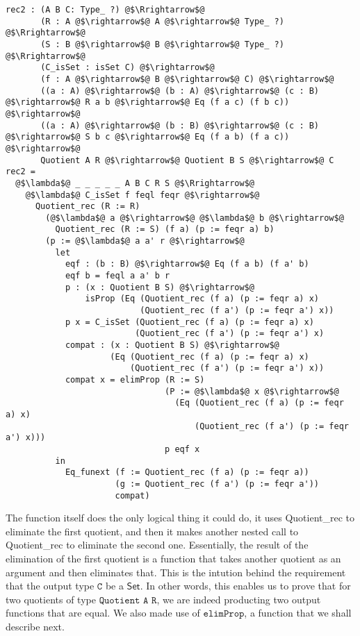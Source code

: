 \documentclass[12pt,twoside,maitrise]{dms}
\theoremstyle{definition}
\numberwithin{equation}{section}
\numberwithin{table}{chapter}
\numberwithin{figure}{chapter}
\newcommand\kw[1] {\textsf{#1}}
\newcommand\id[1] {\texttt{#1}}
\begin{document}
\begin{verbatim}
rec2 : (A B C: Type_ ?) @$\Rrightarrow$@
       (R : A @$\rightarrow$@ A @$\rightarrow$@ Type_ ?) @$\Rrightarrow$@
       (S : B @$\rightarrow$@ B @$\rightarrow$@ Type_ ?) @$\Rrightarrow$@
       (C_isSet : isSet C) @$\rightarrow$@
       (f : A @$\rightarrow$@ B @$\rightarrow$@ C) @$\rightarrow$@
       ((a : A) @$\rightarrow$@ (b : A) @$\rightarrow$@ (c : B) @$\rightarrow$@ R a b @$\rightarrow$@ Eq (f a c) (f b c)) @$\rightarrow$@
       ((a : A) @$\rightarrow$@ (b : B) @$\rightarrow$@ (c : B) @$\rightarrow$@ S b c @$\rightarrow$@ Eq (f a b) (f a c)) @$\rightarrow$@
       Quotient A R @$\rightarrow$@ Quotient B S @$\rightarrow$@ C
rec2 =
  @$\lambda$@ _ _ _ _ _ A B C R S @$\Rrightarrow$@
    @$\lambda$@ C_isSet f feql feqr @$\rightarrow$@
      Quotient_rec (R := R)
        (@$\lambda$@ a @$\rightarrow$@ @$\lambda$@ b @$\rightarrow$@
          Quotient_rec (R := S) (f a) (p := feqr a) b)
        (p := @$\lambda$@ a a' r @$\rightarrow$@
          let
            eqf : (b : B) @$\rightarrow$@ Eq (f a b) (f a' b)
            eqf b = feql a a' b r
            p : (x : Quotient B S) @$\rightarrow$@
                isProp (Eq (Quotient_rec (f a) (p := feqr a) x)
                           (Quotient_rec (f a') (p := feqr a') x))
            p x = C_isSet (Quotient_rec (f a) (p := feqr a) x)
                          (Quotient_rec (f a') (p := feqr a') x)
            compat : (x : Quotient B S) @$\rightarrow$@
                     (Eq (Quotient_rec (f a) (p := feqr a) x)
                         (Quotient_rec (f a') (p := feqr a') x))
            compat x = elimProp (R := S)
                                (P := @$\lambda$@ x @$\rightarrow$@
                                  (Eq (Quotient_rec (f a) (p := feqr a) x)
                                      (Quotient_rec (f a') (p := feqr a') x)))
                                p eqf x
          in
            Eq_funext (f := Quotient_rec (f a) (p := feqr a))
                      (g := Quotient_rec (f a') (p := feqr a'))
                      compat)
\end{verbatim}

The function itself does the only logical thing it could do, it uses \kw{Quotient\_rec} to eliminate the first quotient, and then it makes another nested call to \kw{Quotient\_rec} to eliminate the second one. Essentially, the result of the elimination of the first quotient is a function that takes another quotient as an argument and then eliminates that. This is the intution behind the requirement that the output type $\id{C}$ be a $\kw{Set}$. In other words, this enables us to prove that for two quotients of type $\id{Quotient A R}$, we are indeed producting two output functions that are equal. We also made use of $\id{elimProp}$, a function that we shall describe next.
\end{document}
